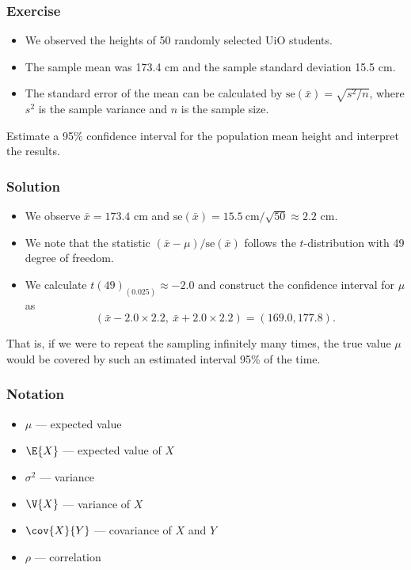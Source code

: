 \documentclass[compress]{beamer}\usepackage[]{graphicx}\usepackage[]{xcolor}
\begin{document}
\begin{frame}[fragile]
  \frametitle{Exercise}
    \begin{itemize}
      \item We observed the heights of 50 randomly selected UiO students.
      \item The sample mean was 173.4 cm and the sample standard deviation 15.5 cm.
      \item The standard error of the mean can be calculated by $\mathrm{se}(\bar{x}) = \sqrt{s^2/n}$, where $s^2$ is the sample variance and $n$ is the sample size.
    \end{itemize}

    Estimate a 95\% confidence interval for the population mean height and interpret the results.
\end{frame}

\begin{frame}[fragile]
  \frametitle{Solution}
    \begin{itemize}
      \item We observe $\bar{x}=173.4$ cm and $\mathrm{se}(\bar{x}) = 15.5\ \text{cm} / \sqrt{50} \approx 2.2$ cm.
      \item We note that the statistic $(\bar{x} - \mu) / \text{se}(\bar{x})$ follows the $t$-distribution with 49 degree of freedom.
      \item We calculate $t(49)_{(0.025)} \approx -2.0$ and construct the confidence interval for $\mu$ as
      \[ \left( \bar{x} - 2.0 \times 2.2,\ \bar{x} + 2.0 \times 2.2 \right) = (169.0, 177.8). \]
    \end{itemize}

    That is, if we were to repeat the sampling infinitely many times, the true value $\mu$ would be covered by such an estimated interval 95\% of the time.
\end{frame}


\begin{frame}[fragile]
  \frametitle{Notation}
    \begin{itemize}
      \item $\mu$ --- expected value
      \item $\E{X}$ --- expected value of $X$
      \item $\sigma^2$ --- variance
      \item $\V{X}$ --- variance of $X$
      \item $\cov{X}{Y}$ --- covariance of $X$ and $Y$
      \item $\rho$ --- correlation
    \end{itemize}
\end{frame}
\end{document}
